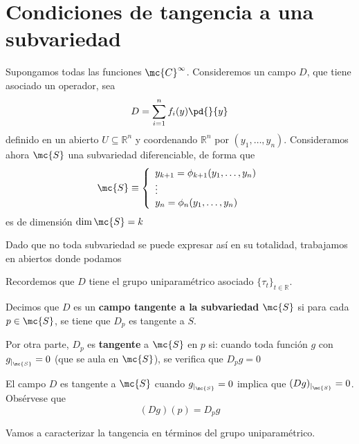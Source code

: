     \section{Condiciones de tangencia a una subvariedad}
    Supongamos todas las funciones $\mc{C}^{\infty}$. Consideremos un campo $D$, que tiene asociado un operador, sea 
    $$D=\sum_{i=1}^n f_i(y) \pd{}{y}$$
    definido en un abierto $U \subseteq \mathbb R^n$ y coordenando $\mathbb R^n$ por $(y_1, \ldots, y_n)$. Consideramos ahora $\mc{S}$ una subvariedad diferenciable, de forma que 
    $$\mc{S} \equiv \left\{ \begin{array}{l}
         y_{k+1}= \phi_{k+1}(y_1, \ldots, y_n)  \\
          \vdots \\
          y_n =\phi_{n}(y_1, \ldots, y_n)
    \end{array} \right.$$
    es de dimensión $\dim \mc{S}=k$ 
    \begin{obs}
        Dado que no toda subvariedad se puede expresar así en su totalidad, trabajamos en abiertos donde podamos
    \end{obs} 

    Recordemos que $D$ tiene el grupo uniparamétrico asociado $\{\tau_t\}_{t \in \mathbb R}$.

    \begin{defi}
        Decimos que $D$ es un \textbf{campo tangente a la subvariedad} $\mc{S}$ si para cada $p \in \mc{S}$, se tiene que $D_p$ es tangente a $S$.
    \end{defi}
    \begin{defi}
        Por otra parte, $D_p$ es \textbf{tangente} a $\mc{S}$ en $p$ si: cuando toda función $g$ con $g_{|_{\mc{S}}}=0$ (que se aula en $\mc{S}$), se verifica que $D_pg=0$
    \end{defi}
    \begin{ejer}
        El campo $D$ es tangente a $\mc{S}$ cuando $g_{|_{\mc{S}}}=0$ implica que $(Dg)_{|_{\mc{S}}}=0$. Obsérvese que 
        $$(Dg)(p)=D_pg$$
    \end{ejer}

    Vamos a caracterizar la tangencia en términos del grupo uniparamétrico.

